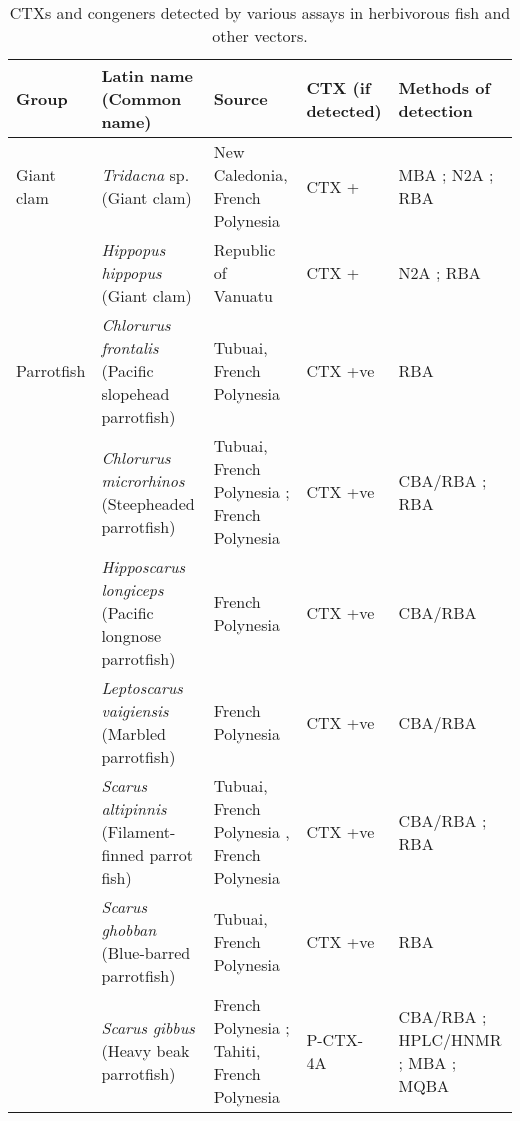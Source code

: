 \documentclass[12pt]{article}
\begin{document}
\begin{longtable}{  | p{2cm} | p{3cm} | p{4.5cm}  | p{2cm} | p{3cm}  | }
\caption{CTXs and congeners detected by various assays in herbivorous fish and other vectors.}\\
\label{tbl:HerbTable}
\textbf{Group} & \textbf{Latin name} (Common name) & \textbf{Source} & \textbf{CTX (if detected)} & \textbf{Methods of detection} \\
\hline
 Giant clam &  \emph{Tridacna} sp. (Giant clam) & New Caledonia, French Polynesia \cite{laurent2012ciguatera} & CTX +\cite{laurent2012ciguatera} & MBA \cite{laurent2012ciguatera}; N2A \cite{laurent2012ciguatera}; RBA \cite{laurent2012ciguatera} \\
  & \emph{Hippopus hippopus} (Giant clam)  & Republic of Vanuatu \cite{laurent2012ciguatera} & CTX +\cite{laurent2012ciguatera} & N2A \cite{laurent2012ciguatera}; RBA \cite{laurent2012ciguatera} \\
  \hline
 Parrotfish & \emph{Chlorurus frontalis} (Pacific slopehead parrotfish) & Tubuai, French Polynesia \cite{darius2007ciguatera} &	CTX +ve \cite{darius2007ciguatera} & RBA \cite{darius2007ciguatera} \\
  &  \emph{Chlorurus microrhinos} (Steepheaded parrotfish) &  Tubuai, French Polynesia \cite{darius2007ciguatera}; French Polynesia \cite{chinain2014mail} &	CTX +ve \cite{darius2007ciguatera,chinain2014mail} & CBA/RBA \cite{chinain2014mail}; RBA \cite{darius2007ciguatera} \\
    & \emph{Hipposcarus longiceps} (Pacific longnose parrotfish) & French Polynesia \cite{chinain2014mail} & CTX +ve \cite{chinain2014mail} & CBA/RBA \cite{chinain2014mail} \\
  & \emph{Leptoscarus vaigiensis} (Marbled parrotfish) & French Polynesia \cite{chinain2014mail} & CTX +ve \cite{chinain2014mail} & CBA/RBA \cite{chinain2014mail} \\
  & \emph{Scarus altipinnis} (Filament-finned parrot fish) & Tubuai, French Polynesia \cite{darius2007ciguatera}, French Polynesia \cite{chinain2014mail} &	CTX +ve \cite{darius2007ciguatera,chinain2014mail} & CBA/RBA \cite{chinain2014mail}; RBA \cite{darius2007ciguatera}  \\
  & \emph{Scarus ghobban} (Blue-barred parrotfish) & Tubuai, French Polynesia \cite{darius2007ciguatera} &	CTX +ve \cite{darius2007ciguatera} & RBA \cite{darius2007ciguatera} \\
  &  \emph{Scarus gibbus} (Heavy beak parrotfish) & French Polynesia \cite{bagnis1987use,satake1996isolation,chinain2014mail}; Tahiti, French Polynesia \cite{pompon1983ciguatera} & P-CTX-4A \cite{satake1996isolation}  & CBA/RBA \cite{chinain2014mail}; HPLC/HNMR \cite{satake1996isolation}; MBA \cite{bagnis1987use,satake1996isolation,pompon1983ciguatera}; MQBA \cite{bagnis1987use}  \\

\end{longtable}
\end{document}
